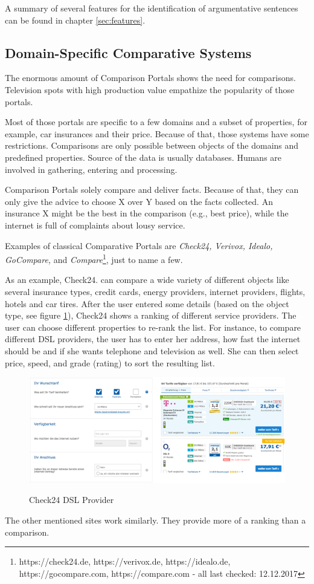 A summary of several features for the identification of argumentative sentences can be found in chapter \ref{sec:features}.





\subsection{Domain-Specific Comparative Systems}
The enormous amount of Comparison Portals shows the need for comparisons. Television spots with high production value empathize the popularity of those portals.

Most of those portals are specific to a few domains and a subset of properties, for example, car insurances and their price. Because of that, those systems have some restrictions. Comparisons are only possible between objects of the domains and predefined properties. Source of the data is usually databases. Humans are involved in gathering, entering and processing. 

Comparison Portals solely compare and deliver facts. Because of that, they can only give the advice to choose X over Y based on the facts collected.  An insurance X might be the best in the comparison (e.g., best price), while the internet is full of complaints about lousy service.\newline

Examples of classical Comparative Portals are \emph{Check24, Verivox, Idealo, GoCompare,} and \emph{Compare}\footnote{https://check24.de, https://verivox.de, https://idealo.de, https://gocompare.com, https://compare.com - all last checked: 12.12.2017}, just to name a few.

As an example, Check24. can compare a wide variety of different objects like several insurance types, credit cards, energy providers, internet providers, flights, hotels and car tires. After the user entered some details (based on the object type, see figure \ref{img:check24}), Check24 shows a ranking of different service providers. The user can choose different properties to re-rank the list.
For instance, to compare different DSL providers, the user has to enter her address, how fast the internet should be and if she wants telephone and television as well. She can then select price, speed, and grade (rating) to sort the resulting list.

\begin{figure}[h]
\includegraphics[width=1\textwidth]{images/ds-sys/check24}
\label{img:check24}
\caption{Check24 DSL Provider}
\end{figure}
The other mentioned sites work similarly. They provide more of a ranking than a comparison.\newline


